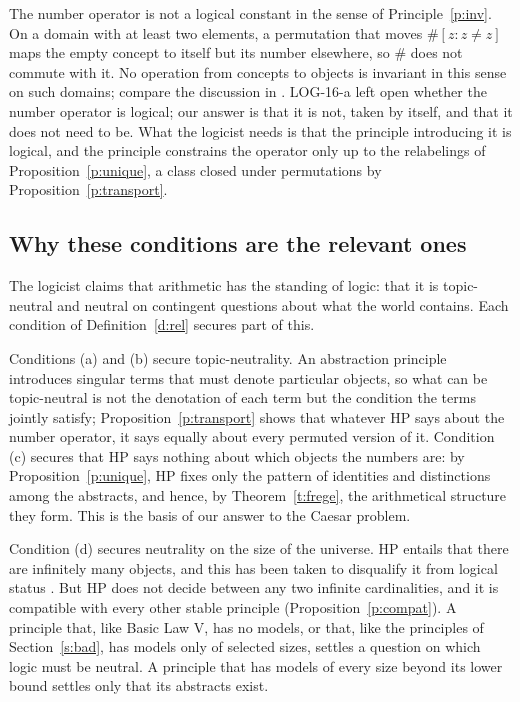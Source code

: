 \documentclass{situationist-preprint}
\begin{document}
\begin{remark}\label{r:naive}
The number operator is not a logical constant in the sense of Principle~\ref{p:inv}. On a domain with at least two elements, a permutation that moves $\#[z : z \neq z]$ maps the empty concept to itself but its number elsewhere, so $\#$ does not commute with it. No operation from concepts to objects is invariant in this sense on such domains; compare the discussion in \citet{Antonelli2010}. LOG-16-a left open whether the number operator is logical; our answer is that it is not, taken by itself, and that it does not need to be. What the logicist needs is that the principle introducing it is logical, and the principle constrains the operator only up to the relabelings of Proposition~\ref{p:unique}, a class closed under permutations by Proposition~\ref{p:transport}.
\end{remark}

\subsection{Why these conditions are the relevant ones}

The logicist claims that arithmetic has the standing of logic: that it is topic-neutral and neutral on contingent questions about what the world contains. Each condition of Definition~\ref{d:rel} secures part of this.

Conditions (a) and (b) secure topic-neutrality. An abstraction principle introduces singular terms that must denote particular objects, so what can be topic-neutral is not the denotation of each term but the condition the terms jointly satisfy; Proposition~\ref{p:transport} shows that whatever HP says about the number operator, it says equally about every permuted version of it. Condition (c) secures that HP says nothing about which objects the numbers are: by Proposition~\ref{p:unique}, HP fixes only the pattern of identities and distinctions among the abstracts, and hence, by Theorem~\ref{t:frege}, the arithmetical structure they form. This is the basis of our answer to the Caesar problem.

Condition (d) secures neutrality on the size of the universe. HP entails that there are infinitely many objects, and this has been taken to disqualify it from logical status \citep{Boolos1997}. But HP does not decide between any two infinite cardinalities, and it is compatible with every other stable principle (Proposition~\ref{p:compat}). A principle that, like Basic Law V, has no models, or that, like the principles of Section~\ref{s:bad}, has models only of selected sizes, settles a question on which logic must be neutral. A principle that has models of every size beyond its lower bound settles only that its abstracts exist.
\end{document}
